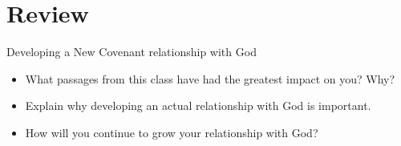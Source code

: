 \section{Review}

\begin{frame}{Developing a New Covenant relationship with God}
	\begin{itemize}
		\item What passages from this class have had the greatest impact on you?  Why?
		\item Explain why developing an actual relationship with God is important.
		\item How will you continue to grow your relationship with God?
	\end{itemize}
	
\end{frame}
